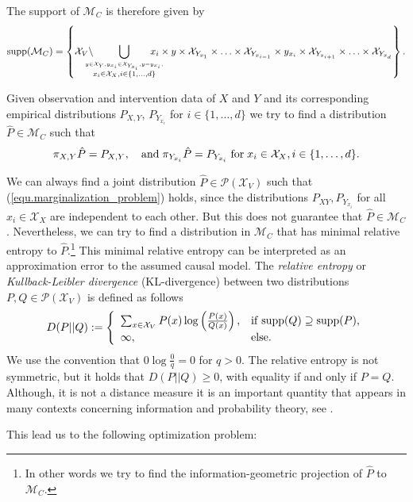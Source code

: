 \documentclass[letterpaper]{article}
\newcommand{\kM}{\mathcal{M}}   %
\newcommand{\kP}{\mathcal{P}}   %
\newcommand{\kX}{\mathcal{X}}   %
\newcommand{\supp}{{\rm supp}}
\begin{document}
The support of $\kM_C$ is therefore given by 
\begin{eqnarray*}
\supp(\kM_C) = \left \{\kX_V \backslash \! \! \! \! \! \! \bigcup_{\stackrel{y\in\kX_Y, y_{x_i}\in \kX_{Y_{x_i}},y=y_{x_i},}{x_i \in \kX_X, i\in \{1,\ldots, d\}}} \! \! \! \! \! \! \! \! \! x_i \times y \times \kX_{Y_{x_1}} \times \ldots \times \kX_{Y_{x_{i-1}}} \times y_{x_i} \times \kX_{Y_{x_{i+1}}} \times \ldots \times \kX_{Y_{x_d}} \right \}.
\end{eqnarray*}

Given observation and intervention data of $X$ and $Y$ and its corresponding empirical distributions $P_{X,Y}$, $P_{Y_{x_i}}$ for $i \in \{1,\ldots, d\}$ we try to find a distribution $\hat P \in \kM_C$ such that
\begin{equation} \label{equ.marginalization_problem}
\pi_{X,Y} \hat P = P_{X,Y}, \quad {\rm and}\; \pi_{Y_{x_i}} \hat P = P_{Y_{x_i}} \; {\rm for} \; x_i \in \kX_X, i\in \{1, \ldots, d\}.
\end{equation}

We can always find a joint distribution $\hat P \in \kP(\kX_V)$ such that (\ref{equ.marginalization_problem}) holds, since  the distributions $P_{XY}, P_{Y_{x_i}}$ for all $x_i \in \kX_X$ are independent to each other. But this does not guarantee that $\hat P \in \kM_C$. Nevertheless, we can try to find a distribution in $\kM_C$ that has minimal relative entropy to $\hat P$.\footnote{In other words we try to find the information-geometric projection of $\hat P$ to $\kM_C$.} This minimal relative entropy can be interpreted as an approximation error to the assumed causal model. The {\em relative entropy} or {\em Kullback-Leibler divergence} (KL-divergence) between two distributions $P, Q \in \kP(\kX_V)$ is defined as follows
$$
D(P || Q) := \left \{ \begin{array}{ll}
\sum_{x \in \kX_V} P(x) \log \left (\frac{P(x)}{Q(x)}\right ), & {\rm if\;} \supp(Q) \supseteq \supp(P), \\
\infty, & {\rm else.}
\end{array}
\right.
$$
We use the convention that $0 \log \frac{0}{q} = 0$ for $q > 0$. The relative entropy is not symmetric, but it holds that $D(P||Q) \ge 0$, with equality if and only if $P=Q$. Although, it is not a distance measure it is an important quantity that appears in many contexts concerning information and probability theory, see \cite{CT91, Kak99}. 

This lead us to the following optimization problem:
\end{document}
